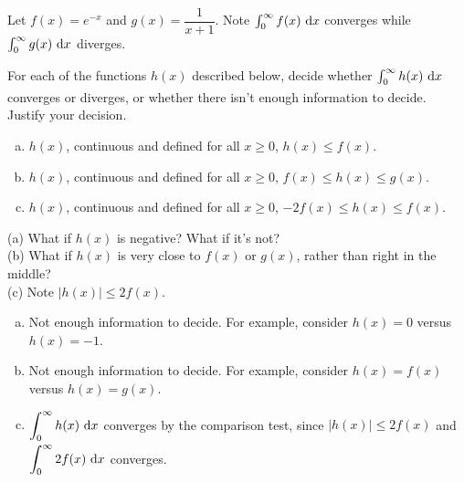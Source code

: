 \begin{question}
Let $f(x) = e^{-x}$ and $g(x)=\dfrac{1}{x+1}$. Note $\int_{0}^\infty f(x)~\mathrm{d}x$ converges while
$\int_{0}^\infty g(x)~\mathrm{d}x$ diverges.

For each of the functions $h(x)$ described below, decide whether $\int_{0\vphantom{\frac12}}^\infty h(x)~\mathrm{d}x$ converges or diverges, or whether there isn't enough information to decide. Justify your decision.

\begin{enumerate}[(a)]
\item $h(x)$, continuous and defined for all $x \ge0$, $h(x) \leq f(x)$.
\item $h(x)$, continuous and defined for all $x\ge 0$, $f(x) \leq h(x) \leq g(x)$.
\item $h(x)$, continuous and defined for all $x\ge 0$, $-2f(x) \leq h(x) \leq f(x)$.
\end{enumerate}
\end{question}
\begin{hint}
(a) What if $h(x)$ is negative? What if it's not?\\
(b) What if $h(x)$ is very close to $f(x)$ or $g(x)$, rather than right in the middle?\\
(c) Note $|h(x)| \leq 2f(x)$.
\end{hint}
\begin{answer}
\begin{enumerate}[(a)]
\item Not enough information to decide. For example, consider $h(x) = 0$ versus $h(x) = -1$.
\item Not enough information to decide. For example, consider $h(x)= f(x)$ versus $h(x) = g(x)$.
\item $\displaystyle\int_{0\vphantom{\frac12}}^{\infty}h(x)~\mathrm{d}x$ converges by the comparison test, since $|h(x)| \leq 2f(x)$ and $\displaystyle\int_0^\infty 2f(x)~\mathrm{d}x$ converges.
\end{enumerate}
\end{answer}
